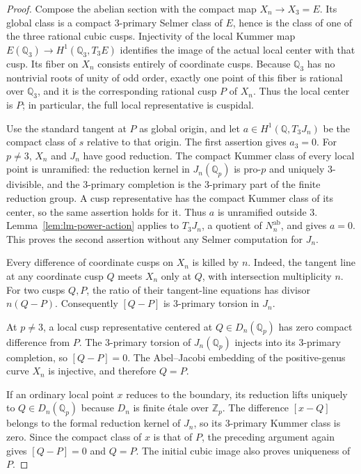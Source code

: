 \begin{proof}
Compose the abelian section with the compact map
$X_n\to X_3=E$.  Its global class is a compact $3$-primary
Selmer class of $E$, hence is the class of one of the three
rational cubic cusps.  Injectivity of the local Kummer map
$E(\mathbb Q_3)\to H^1(\mathbb Q_3,T_3E)$ identifies the
image of the actual local center with that cusp.
Its fiber on $X_n$ consists entirely of coordinate cusps.
Because $\mathbb Q_3$ has no nontrivial roots of unity of
odd order, exactly one point of this fiber is rational over
$\mathbb Q_3$, and it is the corresponding rational cusp
$P$ of $X_n$.  Thus the local center is $P$; in particular,
the full local representative is cuspidal.

Use the standard tangent at $P$ as global origin, and let
$a\in H^1(\mathbb Q,T_3J_n)$ be the compact class of $s$
relative to that origin.  The first assertion gives $a_3=0$.
For $p\ne3$, $X_n$ and $J_n$ have good reduction.  The
compact Kummer class of every local point is unramified:
the reduction kernel in $J_n(\mathbb Q_p)$ is pro-$p$ and
uniquely $3$-divisible, and the $3$-primary completion is
the $3$-primary part of the finite reduction group.
A cusp representative has the compact Kummer class of its
center, so the same assertion holds for it.  Thus $a$ is
unramified outside $3$.  Lemma~\ref{lem:lm-power-action}
applies to $T_3J_n$, a quotient of $N_n^{\mathrm{ab}}$,
and gives $a=0$.  This proves the second assertion without
any Selmer computation for $J_n$.

Every difference of coordinate cusps on $X_n$ is killed
by $n$.  Indeed, the tangent line at any coordinate cusp
$Q$ meets $X_n$ only at $Q$, with intersection multiplicity
$n$.  For two cusps $Q,P$, the ratio of their tangent-line
equations has divisor $n(Q-P)$.  Consequently $[Q-P]$
is $3$-primary torsion in $J_n$.

At $p\ne3$, a local cusp representative centered at
$Q\in D_n(\mathbb Q_p)$ has zero compact difference from
$P$.  The $3$-primary torsion of $J_n(\mathbb Q_p)$
injects into its $3$-primary completion, so $[Q-P]=0$.
The Abel--Jacobi embedding of the positive-genus curve
$X_n$ is injective, and therefore $Q=P$.

If an ordinary local point $x$ reduces to the boundary,
its reduction lifts uniquely to
$Q\in D_n(\mathbb Q_p)$ because $D_n$ is finite \'etale
over $\mathbb Z_p$.  The difference $[x-Q]$ belongs to
the formal reduction kernel of $J_n$, so its $3$-primary
Kummer class is zero.  Since the compact class of $x$
is that of $P$, the preceding argument again gives
$[Q-P]=0$ and $Q=P$.
The initial cubic image also proves uniqueness of $P$.
\end{proof}


